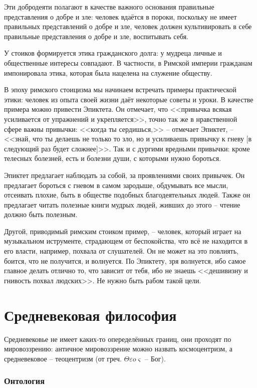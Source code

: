 \documentclass[a4paper, 12pt]{book} %
\begin{document}
Эти добродеяти полагают в качестве важного основания правильные представления о добре и зле: человек вдаётся в пороки, поскольку не имеет правильных представлений о добре и зле, человек должен культивировать в себе правильные представления о добре и зле, воспитывать себя.


У стоиков формируется этика гражданского долга: у мудреца личные и общественные интересы совпадают. В частности, в Римской империи гражданам импонировала этика, которая была нацелена на служение обществу. 

В эпоху римского стоицизма мы начинаем встречать примеры практической этики: человек из опыта своей жизни даёт некоторые советы и уроки. В качестве примера можно привести Эпиктета. Он отмечает, что <<привычка всякая усиливается от упражнений и укрепляется>>, точно так же в нравственной сфере важны привычки: <<когда ты сердишься,>> -- отмечает Эпиктет, --  <<знай, что ты делаешь не только то зло, но и усиливаешь привычку к гневу [в следующий раз будет сложнее]>>. Так и с дургими вредными привычки: кроме телесных болезней, есть и болезни души, с которыми нужно бороться.

 Эпиктет предлагает наблюдать за собой, за проявлениями своих привычек. Он предлагает бороться с гневом в самом зародыше, обдумывать все мысли, отсеивать плохие, быть в обществе подобных благодеятельных людей. Также он предлагает читать полезные книги мудрых людей, живших до этого -- чтение должно быть полезным.
 
Другой, приводимый римским стоиком пример, -- человек, который играет на музыкальном иструменте, страдающем от беспокойства, что всё не находится в его власти, например, похвала от слушателей. Он не может на это повлиять, боится, что не получится, и волнуется. По Эпиктету, зря волнуется, ибо самое главное делать отлично то, что зависит от тебя, ибо не знаешь <<дешивизну и гнивость похвал людских>>. Не нужно быть рабом такой цели.

\section{Средневековая философия}

Средневековье не имеет каких-то опеределённых границ, они проходят по мировоззрению: античное мировоззрение можно назвать космоцентризм, а средневековое -- теоцентризм (от греч. $\Theta \varepsilon o \varsigma $ -- Бог). 


\subsubsection{Онтология}
\end{document}
